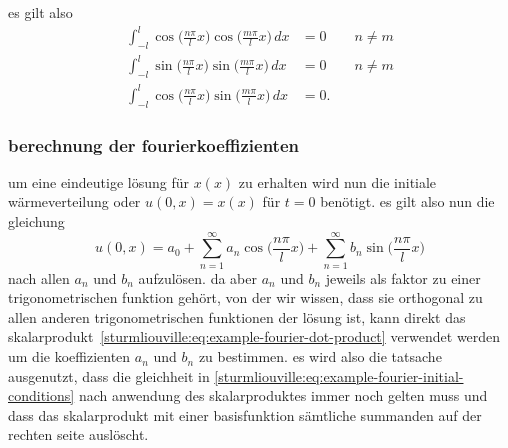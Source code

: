 es gilt also
\[
\begin{aligned}
    \int_{-l}^{l}\cos\biggl(\frac{n \pi}{l}x\biggr)
    \cos\biggl(\frac{m \pi}{l}x\biggr)\,dx
    &= 0 \qquad n \neq m \\
    \int_{-l}^{l}\sin\biggl(\frac{n \pi}{l}x\biggr)
    \sin\biggl(\frac{m \pi}{l}x\biggr)\,dx
    &= 0 \qquad n \neq m \\
    \int_{-l}^{l}\cos\biggl(\frac{n \pi}{l}x\biggr)
    \sin\biggl(\frac{m \pi}{l}x\biggr)\,dx
    &= 0.
\end{aligned}
\]

\subsubsection{berechnung der fourierkoeffizienten}

%
%

um eine eindeutige lösung für $x(x)$ zu erhalten wird nun die initiale
wärmeverteilung oder $u(0, x) = x(x)$ für $t = 0$ benötigt.
es gilt also nun die gleichung
\begin{equation}
    \label{sturmliouville:eq:example-fourier-initial-conditions}
    u(0, x)
    =
    a_0
    +
    \sum_{n = 1}^{\infty} a_n\cos\biggl(\frac{n\pi}{l}x\biggr)
    +
    \sum_{n = 1}^{\infty} b_n\sin\biggl(\frac{n\pi}{l}x\biggr)
\end{equation}
nach allen $a_n$ und $b_n$ aufzulösen.
da aber $a_n$ und $b_n$ jeweils als faktor zu einer trigonometrischen funktion
gehört, von der wir wissen, dass sie orthogonal zu allen anderen
trigonometrischen funktionen der lösung ist, kann direkt das
skalarprodukt~\eqref{sturmliouville:eq:example-fourier-dot-product}
verwendet werden um die koeffizienten $a_n$ und $b_n$ zu bestimmen.
es wird also die tatsache ausgenutzt, dass die gleichheit in
\eqref{sturmliouville:eq:example-fourier-initial-conditions} nach anwendung des
skalarproduktes immer noch gelten muss und dass das skalarprodukt mit einer
basisfunktion sämtliche summanden auf der rechten seite auslöscht.

